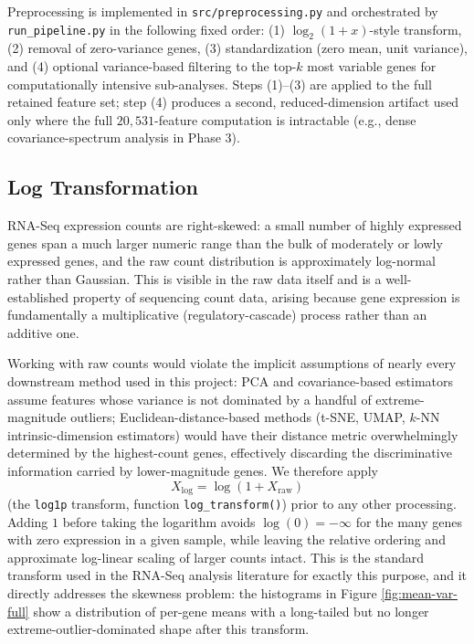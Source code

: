 \documentclass[11pt]{article}
\begin{document}
Preprocessing is implemented in \texttt{src/preprocessing.py} and
orchestrated by \texttt{run\_pipeline.py} in the following fixed order:
(1) $\log_2(1+x)$-style transform, (2) removal of zero-variance genes,
(3) standardization (zero mean, unit variance), and (4) optional
variance-based filtering to the top-$k$ most variable genes for
computationally intensive sub-analyses. Steps (1)--(3) are applied to the
full retained feature set; step (4) produces a second, reduced-dimension
artifact used only where the full $20{,}531$-feature computation is
intractable (e.g., dense covariance-spectrum analysis in Phase 3).

\subsection{Log Transformation}
\label{sec:log-transform}

RNA-Seq expression counts are right-skewed: a small number of highly
expressed genes span a much larger numeric range than the bulk of
moderately or lowly expressed genes, and the raw count distribution is
approximately log-normal rather than Gaussian. This is visible in the raw
data itself and is a well-established property of sequencing count data,
arising because gene expression is fundamentally a multiplicative
(regulatory-cascade) process rather than an additive one.

Working with raw counts would violate the implicit assumptions of nearly
every downstream method used in this project: PCA and covariance-based
estimators assume features whose variance is not dominated by a handful
of extreme-magnitude outliers; Euclidean-distance-based methods (t-SNE,
UMAP, $k$-NN intrinsic-dimension estimators) would have their distance
metric overwhelmingly determined by the highest-count genes, effectively
discarding the discriminative information carried by lower-magnitude
genes. We therefore apply
\[
  X_{\log} = \log(1 + X_{\text{raw}})
\]
(the \texttt{log1p} transform, function \texttt{log\_transform()}) prior
to any other processing. Adding $1$ before taking the logarithm avoids
$\log(0) = -\infty$ for the many genes with zero expression in a given
sample, while leaving the relative ordering and approximate log-linear
scaling of larger counts intact. This is the standard transform used in
the RNA-Seq analysis literature for exactly this purpose, and it directly
addresses the skewness problem: the histograms in Figure
\ref{fig:mean-var-full} show a distribution of per-gene means with a
long-tailed but no longer extreme-outlier-dominated shape after this
transform.
\end{document}
